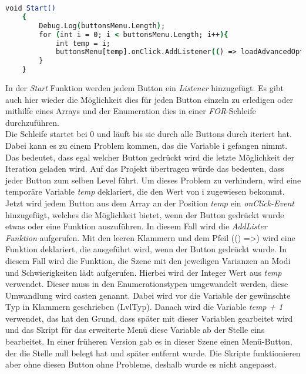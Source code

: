 \begin{lstlisting}[language=csh, caption={MenuPickLevel.cs Klasse Menü Start-Funktion}]
	void Start()
	{
		Debug.Log(buttonsMenu.Length);
		for (int i = 0; i < buttonsMenu.Length; i++){
			int temp = i;
			buttonsMenu[temp].onClick.AddListener(() => loadAdvancedOptions((LvlType)temp + 1));
		}
	}
\end{lstlisting}
In der \textit{Start} Funktion werden jedem Button ein \textit{Listener} hinzugefügt. Es gibt auch hier wieder die Möglichkeit dies für jeden Button einzeln zu erledigen oder mithilfe eines Arrays und der Enumeration dies in einer \textit{FOR}-Schleife durchzuführen.\\
Die Schleife startet bei 0 und läuft bis sie durch alle Buttons durch iteriert hat. Dabei kann es zu einem Problem kommen, das die Variable i gefangen nimmt. Das bedeutet, dass egal welcher Button gedrückt wird die letzte Möglichkeit der Iteration geladen wird. Auf das Projekt übertragen würde das bedeuten, dass jeder Button zum selben Level führt. Um dieses Problem zu verhindern, wird eine temporäre Variable \textit{temp} deklariert, die den Wert von i zugewiesen bekommt. Jetzt wird jedem Button aus dem Array an der Position \textit{temp} ein \textit{onClick-Event} hinzugefügt, welches die Möglichkeit bietet, wenn der Button gedrückt wurde etwas oder eine Funktion auszuführen. In diesem Fall wird die \textit{AddLister Funktion} aufgerufen. Mit den leeren Klammern und dem Pfeil (() =>) wird eine Funktion deklariert, die ausgeführt wird, wenn der Button gedrückt wurde. In diesem Fall wird die Funktion, die Szene mit den jeweiligen Varianzen an Modi und Schwierigkeiten lädt aufgerufen. Hierbei wird der Integer Wert aus \textit{temp} verwendet. Dieser muss in den Enumerationstypen umgewandelt werden, diese Umwandlung wird casten genannt. Dabei wird vor die Variable der gewünschte Typ in Klammern geschrieben (LvlTyp). Danach wird die Variable \textit{temp + 1} verwendet, das hat den Grund, dass später mit dieser Variablen gearbeitet wird und das Skript für das erweiterte Menü diese Variable ab der Stelle eins bearbeitet. In einer früheren Version gab es in dieser Szene einen Menü-Button, der die Stelle null belegt hat und später entfernt wurde. Die Skripte funktionieren aber ohne diesen Button ohne Probleme, deshalb wurde es nicht angepasst.\\

